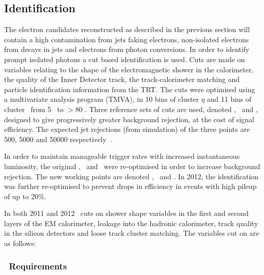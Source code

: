 \subsection{Identification}
\label{sec:reco-el-id}

The electron candidates reconstructed as described in the previous section will
contain a high contamination from jets faking electrons, non-isolated electrons
from decays in jets and electrons from photon conversions. In order to identify prompt isolated photons a
cut based identification is used. Cuts are made on variables relating to the
shape of the electromagnetic shower in the calorimeter, the quality of the Inner Detector track, the
track-calorimeter matching and particle identification information from the
TRT. The cuts were optimised using a multivariate analysis program (TMVA), in 10 bins
of cluster $\eta$ and 11 bins of cluster \et\ from 5 \gev\ to $>80$ \gev.
Three reference sets of cuts are used, denoted \loose, \medium\ and \tight,
designed to give progressively greater background rejection, at the cost of
signal efficiency. The expected jet rejections (from simulation) of the three points are 500, 5000
and 50000 respectively~\cite{ATL-PHYS-PUB-2011-006}.

In order to maintain manageable trigger rates with increased instantaneous
luminosity, the original \loose, \medium\ and \tight\ were re-optimised in order
to increase background rejection. The new working points are denoted \loosePP,
\mediumPP\ and \tightPP. In 2012, the identification was further re-optimised to
prevent drops in efficiency in events with high pileup of up to 20\%. 

In both 2011 and 2012 \loosePP\ cuts on shower shape variables in the first and
second layers of the EM calorimeter, leakage into the hadronic
calorimeter, track quality in the silicon detectors and loose track cluster
matching. The variables cut on are as follows:

\subsubsection{\loosePP\ Requirements}

